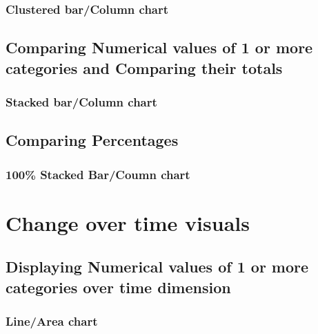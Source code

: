 \documentclass[
]{book}
\begin{document}
\hypertarget{clustered-barcolumn-chart}{%
\subsubsection{Clustered bar/Column chart}\label{clustered-barcolumn-chart}}

\hypertarget{comparing-numerical-values-of-1-or-more-categories-and-comparing-their-totals}{%
\subsection{Comparing Numerical values of 1 or more categories and Comparing their totals}\label{comparing-numerical-values-of-1-or-more-categories-and-comparing-their-totals}}

\hypertarget{stacked-barcolumn-chart}{%
\subsubsection{Stacked bar/Column chart}\label{stacked-barcolumn-chart}}

\hypertarget{comparing-percentages}{%
\subsection{Comparing Percentages}\label{comparing-percentages}}

\hypertarget{stacked-barcoumn-chart}{%
\subsubsection{100\% Stacked Bar/Coumn chart}\label{stacked-barcoumn-chart}}

\hypertarget{change-over-time-visuals}{%
\section{Change over time visuals}\label{change-over-time-visuals}}

\hypertarget{displaying-numerical-values-of-1-or-more-categories-over-time-dimension}{%
\subsection{Displaying Numerical values of 1 or more categories over time dimension}\label{displaying-numerical-values-of-1-or-more-categories-over-time-dimension}}

\hypertarget{linearea-chart}{%
\subsubsection{Line/Area chart}\label{linearea-chart}}
\end{document}
